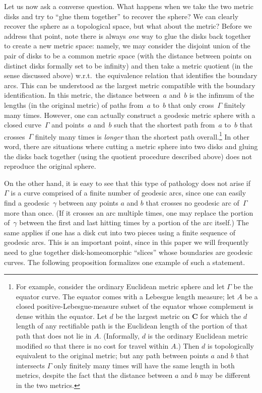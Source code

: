 \documentclass[JEP,XML,SOM,Unicode]{cedram}
\theoremstyle{plain}
\numberwithin{theorem}{section}
\theoremstyle{definition}
\newcommand{\C}{\mathbf{C}}
\begin{document}
Let us now ask a converse question. What happens when we take the two metric disks and try to ``glue them together'' to recover the sphere? We can clearly recover the sphere as a topological space, but what about the metric? Before we address that point, note there is always \emph{one} way to glue the disks back together to create a new metric space: namely, we may consider the disjoint union of the pair of disks to be a common metric space (with the distance between points on distinct disks formally set to be infinity) and then take a metric quotient (in the sense discussed above) w.r.t.\ the equivalence relation that identifies the boundary arcs. This can be understood as the largest metric compatible with the boundary identification. In this metric, the distance between~$a$ and~$b$ is the infimum of the lengths (in the original metric) of paths from~$a$ to~$b$ that only cross~$\Gamma$ finitely many times. However, one can actually construct a geodesic metric sphere with a closed curve~$\Gamma$ and points~$a$ and~$b$ such that the shortest path from~$a$ to~$b$ that crosses~$\Gamma$ finitely many times is \emph{longer} than the shortest path overall.\footnote{For example, consider the ordinary Euclidean metric sphere and let $\Gamma$ be the equator curve. The equator comes with a Lebesgue length measure; let $A$ be a closed positive-Lebesgue-measure subset of the equator whose complement is dense within the equator. Let $d$ be the largest metric on $\C$ for which the $d$ length of any rectifiable path is the Euclidean length of the portion of that path that does not lie in $A$. (Informally, $d$ is the ordinary Euclidean metric modified so that there is no cost for travel within $A$.) Then $d$ is topologically equivalent to the original metric; but any path between points $a$ and $b$ that intersects $\Gamma$ only finitely many times will have the same length in both metrics, despite the fact that the distance between $a$ and $b$ may be different in the two metrics.} In other word, there are situations where cutting a metric sphere into two disks and gluing the disks back together (using the quotient procedure described above) does not reproduce the original sphere.

On the other hand, it is easy to see that this type of pathology does not arise if~$\Gamma$ is a curve comprised of a finite number of geodesic arcs, since one can easily find a geodesic~$\gamma$ between any points $a$ and $b$ that crosses no geodesic arc of~$\Gamma$ more than once. (If it crosses an arc multiple times, one may replace the portion of~$\gamma$ between the first and last hitting times by a portion of the arc itself.) The same applies if one has a disk cut into two pieces using a finite sequence of geodesic arcs. This is an important point, since in this paper we will frequently need to glue together disk-homeomorphic ``slices'' whose boundaries are geodesic curves. The following proposition formalizes one example of such a statement.
\end{document}
